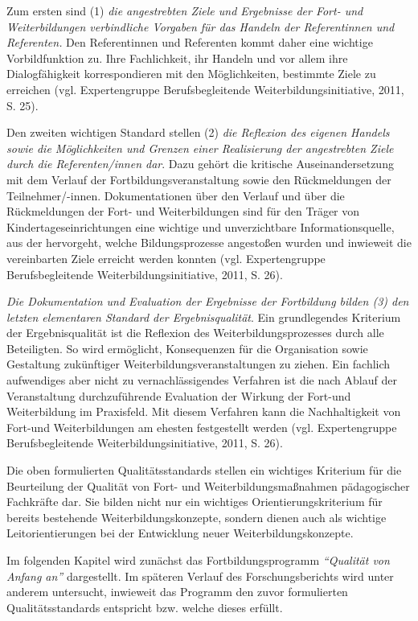 \documentclass[12pt,a4paper]{article}
\begin{document}
Zum ersten sind (1) \textit{die angestrebten Ziele und Ergebnisse der Fort- und Weiterbildungen verbindliche Vorgaben für das Handeln der Referentinnen und Referenten. }Den Referentinnen und Referenten kommt daher eine wichtige Vorbildfunktion zu. Ihre Fachlichkeit, ihr Handeln und vor allem ihre Dialogfähigkeit korrespondieren mit den Möglichkeiten, bestimmte Ziele zu erreichen (vgl. Expertengruppe Berufsbegleitende Weiterbildungsinitiative, 2011, S. 25). 

Den zweiten wichtigen Standard stellen (2) \textit{die Reflexion des eigenen Handels sowie die Möglichkeiten und Grenzen einer Realisierung der angestrebten Ziele durch die Referenten/innen dar}. Dazu gehört die kritische Auseinandersetzung mit dem Verlauf der Fortbildungsveranstaltung sowie den Rückmeldungen der Teilnehmer/-innen. Dokumentationen über den Verlauf und über die Rückmeldungen der Fort- und Weiterbildungen sind für den Träger von Kindertageseinrichtungen eine wichtige und unverzichtbare Informationsquelle, aus der hervorgeht, welche Bildungsprozesse angestoßen wurden und inwieweit die vereinbarten Ziele erreicht werden konnten (vgl. Expertengruppe Berufsbegleitende Weiterbildungsinitiative, 2011, S. 26). 

\textit{Die Dokumentation und Evaluation der Ergebnisse der Fortbildung bilden (3) den letzten elementaren Standard der Ergebnisqualität}. Ein grundlegendes Kriterium der Ergebnisqualität ist die Reflexion des Wei\-ter\-bil\-dungs\-pro\-zes\-ses durch alle Beteiligten. So wird ermöglicht, Konsequenzen für die Organisation sowie Gestaltung zukünftiger Weiterbildungsveranstaltungen zu ziehen. Ein fachlich aufwendiges aber nicht zu vernachlässigendes Verfahren ist die nach Ablauf der Veranstaltung durchzuführende Evaluation der Wirkung der Fort-und Weiterbildung im Praxisfeld. Mit diesem Verfahren kann die Nachhaltigkeit von Fort-und Weiterbildungen am ehesten festgestellt werden (vgl. Expertengruppe Berufsbegleitende Weiterbildungsinitiative, 2011, S. 26). 

	Die oben formulierten Qualitätsstandards stellen ein wichtiges Kriterium für die Beurteilung der Qualität von Fort- und Weiterbildungsmaßnahmen pädagogischer Fachkräfte dar. Sie bilden nicht nur ein wichtiges Orientierungskriterium für bereits bestehende Wei\-ter\-bil\-dungs\-kon\-zep\-te, sondern dienen auch als wichtige Leitorientierungen bei der Entwicklung neuer Weiterbildungskonzepte. 
	
	Im folgenden Kapitel wird zunächst das Fortbildungsprogramm \textit{"`Qualität von Anfang an"'} dargestellt. Im späteren Verlauf des Forschungsberichts wird unter anderem untersucht, inwieweit das Programm den zuvor formulierten Qualitätsstandards entspricht bzw. welche dieses erfüllt.
 
\end{document}
